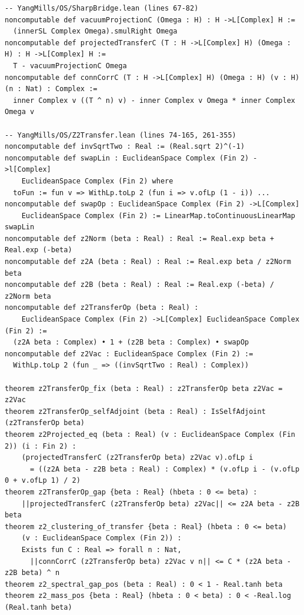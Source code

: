 \documentclass[11pt]{article}
\theoremstyle{remark}
\theoremstyle{definition}
\begin{document}
\begin{footnotesize}
\begin{verbatim}
-- YangMills/OS/SharpBridge.lean (lines 67-82)
noncomputable def vacuumProjectionC (Omega : H) : H ->L[Complex] H :=
  (innerSL Complex Omega).smulRight Omega
noncomputable def projectedTransferC (T : H ->L[Complex] H) (Omega : H) : H ->L[Complex] H :=
  T - vacuumProjectionC Omega
noncomputable def connCorrC (T : H ->L[Complex] H) (Omega : H) (v : H) (n : Nat) : Complex :=
  inner Complex v ((T ^ n) v) - inner Complex v Omega * inner Complex Omega v

-- YangMills/OS/Z2Transfer.lean (lines 74-165, 261-355)
noncomputable def invSqrtTwo : Real := (Real.sqrt 2)^(-1)
noncomputable def swapLin : EuclideanSpace Complex (Fin 2) ->l[Complex]
    EuclideanSpace Complex (Fin 2) where
  toFun := fun v => WithLp.toLp 2 (fun i => v.ofLp (1 - i)) ...
noncomputable def swapOp : EuclideanSpace Complex (Fin 2) ->L[Complex]
    EuclideanSpace Complex (Fin 2) := LinearMap.toContinuousLinearMap swapLin
noncomputable def z2Norm (beta : Real) : Real := Real.exp beta + Real.exp (-beta)
noncomputable def z2A (beta : Real) : Real := Real.exp beta / z2Norm beta
noncomputable def z2B (beta : Real) : Real := Real.exp (-beta) / z2Norm beta
noncomputable def z2TransferOp (beta : Real) :
    EuclideanSpace Complex (Fin 2) ->L[Complex] EuclideanSpace Complex (Fin 2) :=
  (z2A beta : Complex) • 1 + (z2B beta : Complex) • swapOp
noncomputable def z2Vac : EuclideanSpace Complex (Fin 2) :=
  WithLp.toLp 2 (fun _ => ((invSqrtTwo : Real) : Complex))

theorem z2TransferOp_fix (beta : Real) : z2TransferOp beta z2Vac = z2Vac
theorem z2TransferOp_selfAdjoint (beta : Real) : IsSelfAdjoint (z2TransferOp beta)
theorem z2Projected_eq (beta : Real) (v : EuclideanSpace Complex (Fin 2)) (i : Fin 2) :
    (projectedTransferC (z2TransferOp beta) z2Vac v).ofLp i
      = ((z2A beta - z2B beta : Real) : Complex) * (v.ofLp i - (v.ofLp 0 + v.ofLp 1) / 2)
theorem z2TransferOp_gap {beta : Real} (hbeta : 0 <= beta) :
    ||projectedTransferC (z2TransferOp beta) z2Vac|| <= z2A beta - z2B beta
theorem z2_clustering_of_transfer {beta : Real} (hbeta : 0 <= beta)
    (v : EuclideanSpace Complex (Fin 2)) :
    Exists fun C : Real => forall n : Nat,
      ||connCorrC (z2TransferOp beta) z2Vac v n|| <= C * (z2A beta - z2B beta) ^ n
theorem z2_spectral_gap_pos (beta : Real) : 0 < 1 - Real.tanh beta
theorem z2_mass_pos {beta : Real} (hbeta : 0 < beta) : 0 < -Real.log (Real.tanh beta)


\end{verbatim}
\end{footnotesize}
\end{document}
